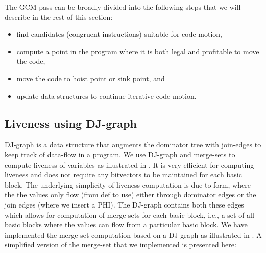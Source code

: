 \documentclass[acmlarge,review,anonymous]{acmart}\settopmatter{printfolios=true}
\begin{document}
The GCM pass can be broadly divided into the following steps that we will
describe in the rest of this section:
\begin{itemize}
\item find candidates (congruent instructions) suitable for code-motion,
\item compute a point in the program where it is both legal and profitable to
  move the code,
\item move the code to hoist point or sink point, and
\item update data structures to continue iterative code motion.
\end{itemize}

\subsection{Liveness using DJ-graph}
DJ-graph \cite{Sreedhar1996} is a data structure that augments the dominator
tree with join-edges to keep track of data-flow in a program. We use DJ-graph
and merge-sets to compute liveness of variables as illustrated in
\cite{das2012}.  It is very efficient for computing liveness and does not
require any bitvectors to be maintained for each basic block. The underlying
simplicity of liveness computation is due to \SSA{} form, where the the values
only flow (from def to use) either through dominator edges or the join edges
(where we insert a PHI). The DJ-graph contains both these edges which allows for
computation of merge-sets for each basic block, i.e., a set of all basic blocks
where the values can flow from a particular basic block. We have implemented the
merge-set computation based on a DJ-graph as illustrated in \cite{das2005}. A
simplified version of the merge-set that we implemented is presented here:
\end{document}
